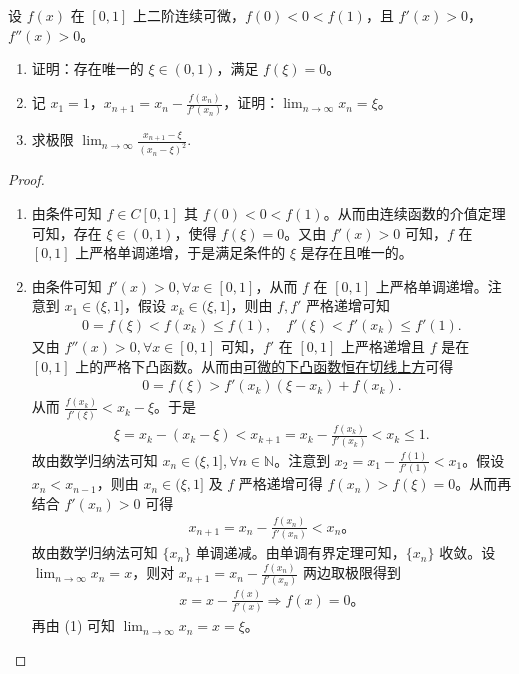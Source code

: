 \documentclass[../../main.tex]{subfiles}%
\begin{document}
\begin{example}
设 $f(x)$ 在 $[0,1]$ 上二阶连续可微，$f(0)<0<f(1)$，且 $f'(x)>0$，$f''(x)>0$。
\begin{enumerate}[(1)]
\item 证明：存在唯一的 $\xi \in (0,1)$，满足 $f(\xi) = 0$。
\item 记 $x_1 = 1$，$x_{n+1} = x_n - \frac{f(x_n)}{f'(x_n)}$，证明：$\lim_{n \to \infty} x_n = \xi$。
\item 求极限 $\lim_{n \to \infty} \frac{x_{n+1} - \xi}{(x_n - \xi)^2}$.
\end{enumerate}
\end{example}
\begin{proof}
\begin{enumerate}[(1)]
\item 由条件可知 $f \in C[0,1]$ 其 $f(0) < 0 < f(1)$。从而由连续函数的介值定理可知，存在 $\xi \in (0,1)$，使得 $f(\xi) = 0$。又由 $f'(x) > 0$ 可知，$f$ 在 $[0,1]$ 上严格单调递增，于是满足条件的 $\xi$ 是存在且唯一的。

\item 由条件可知 $f'(x) > 0, \forall x \in [0,1]$，从而 $f$ 在 $[0,1]$ 上严格单调递增。注意到 $x_1 \in (\xi, 1]$，假设 $x_k \in (\xi, 1]$，则由 $f, f'$ 严格递增可知
\begin{align*}
0 = f(\xi) < f(x_k) \leqslant f(1), \quad f'(\xi) < f'(x_k) \leqslant f'(1).
\end{align*}
又由 $f''(x) > 0, \forall x \in [0,1]$ 可知，$f'$ 在 $[0,1]$ 上严格递增且 $f$ 是在 $[0,1]$ 上的严格下凸函数。从而由\hyperref[Basis of Analytics-可微的下凸函数恒在切线上方]{可微的下凸函数恒在切线上方}可得
\begin{align*}
0 = f(\xi) > f'(x_k)(\xi - x_k) + f(x_k).
\end{align*}
从而 $\frac{f(x_k)}{f'(\xi)} < x_k - \xi$。于是
\begin{align*}
\xi = x_k - (x_k - \xi) < x_{k+1} = x_k - \frac{f(x_k)}{f'(x_k)} < x_k \leqslant 1.
\end{align*}
故由数学归纳法可知 $x_n \in (\xi, 1], \forall n \in \mathbb{N}$。注意到 $x_2 = x_1 - \frac{f(1)}{f'(1)} < x_1$。假设 $x_n < x_{n-1}$，则由 $x_n \in (\xi, 1]$ 及 $f$ 严格递增可得 $f(x_n) > f(\xi) = 0$。从而再结合 $f'(x_n) > 0$ 可得
\begin{align*}
x_{n+1} = x_n - \frac{f(x_n)}{f'(x_n)} < x_n。
\end{align*}
故由数学归纳法可知 $\{x_n\}$ 单调递减。由单调有界定理可知，$\{x_n\}$ 收敛。设 $\lim_{n \to \infty} x_n = x$，则对 $x_{n+1} = x_n - \frac{f(x_n)}{f'(x_n)}$ 两边取极限得到
\begin{align*}
x = x - \frac{f(x)}{f'(x)} \Rightarrow f(x) = 0。
\end{align*}
再由 (1) 可知 $\lim_{n \to \infty} x_n = x = \xi$。


\end{enumerate}
\end{proof}
\end{document}
